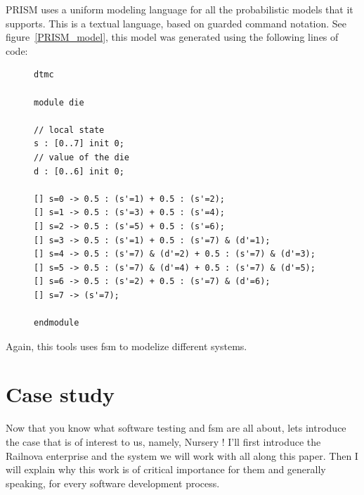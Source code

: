 \documentclass[12pt]{article}
\theoremstyle{definition}
\theoremstyle{definition}
\begin{document}
PRISM uses a uniform modeling language for all the probabilistic models that it supports. This is a textual language, based on guarded command notation. See figure~\ref{PRISM_model}, this model was generated using the following lines of code:

\lstset{
  showspaces=false,
  showstringspaces=false,
  showtabs=false
}

\begin{figure}
\label{PRISM_code}
\begin{lstlisting}[frame=single,caption="Dice model in PRISM",label={lst:PRISM_code}]
dtmc

module die

// local state
s : [0..7] init 0;
// value of the die
d : [0..6] init 0;

[] s=0 -> 0.5 : (s'=1) + 0.5 : (s'=2);
[] s=1 -> 0.5 : (s'=3) + 0.5 : (s'=4);
[] s=2 -> 0.5 : (s'=5) + 0.5 : (s'=6);
[] s=3 -> 0.5 : (s'=1) + 0.5 : (s'=7) & (d'=1);
[] s=4 -> 0.5 : (s'=7) & (d'=2) + 0.5 : (s'=7) & (d'=3);
[] s=5 -> 0.5 : (s'=7) & (d'=4) + 0.5 : (s'=7) & (d'=5);
[] s=6 -> 0.5 : (s'=2) + 0.5 : (s'=7) & (d'=6);
[] s=7 -> (s'=7);

endmodule
\end{lstlisting}
\end{figure}

Again, this tools uses \gls{fsm} to modelize different systems.


\clearpage
\part{Case study}

Now that you know what software testing and \gls{fsm} are all about, lets introduce the case that is of interest to us, namely, Nursery ! I'll first introduce the Railnova enterprise and the system we will work with all along this paper. Then I will explain why this work is of critical importance for them and generally speaking, for every software development process.
\end{document}
